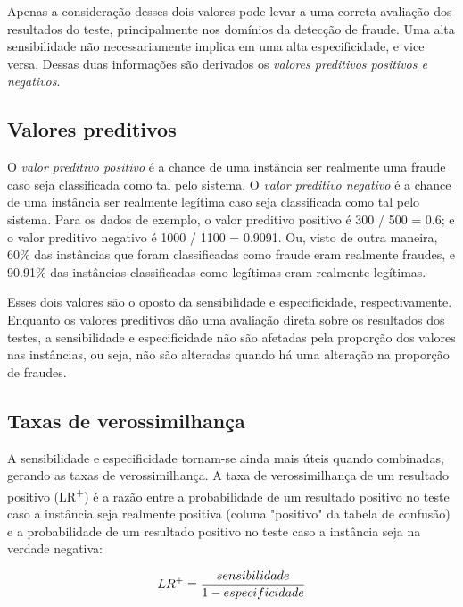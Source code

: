 Apenas a consideração desses dois valores pode levar a uma correta avaliação dos resultados do teste, principalmente nos domínios da detecção de fraude. Uma alta sensibilidade não necessariamente implica em uma alta especificidade, e vice versa. Dessas duas informações são derivados os \emph{valores preditivos positivos e negativos}.

\subsection{Valores preditivos}

O \emph{valor preditivo positivo} é a chance de uma instância ser realmente uma fraude caso seja classificada como tal pelo sistema. O \emph{valor preditivo negativo} é a chance de uma instância ser realmente legítima caso seja classificada como tal pelo sistema. Para os dados de exemplo, o valor preditivo positivo é 300 / 500 = 0.6; e o valor preditivo negativo é 1000 / 1100 = 0.9091. Ou, visto de outra maneira, 60\% das instâncias que foram classificadas como fraude eram realmente fraudes, e 90.91\% das instâncias classificadas como legítimas eram realmente legítimas.

Esses dois valores são o oposto da sensibilidade e especificidade, respectivamente. Enquanto os valores preditivos dão uma avaliação direta sobre os resultados dos testes, a sensibilidade e especificidade não são afetadas pela proporção dos valores nas instâncias, ou seja, não são alteradas quando há uma alteração na proporção de fraudes.

\subsection{Taxas de verossimilhança}

A sensibilidade e especificidade tornam-se ainda mais úteis quando combinadas, gerando as taxas de verossimilhança. A taxa de verossimilhança de um resultado positivo (LR\textsuperscript{+}) é a razão entre a probabilidade de um resultado positivo no teste caso a instância seja realmente positiva (coluna "positivo" da tabela de confusão) e a probabilidade de um resultado positivo no teste caso a instância seja na verdade negativa:

\begin{equation}
    \vspace{2mm}
    LR^{+}=\frac{sensibilidade}{1 - especificidade}
    \vspace{2mm}
\end{equation}

